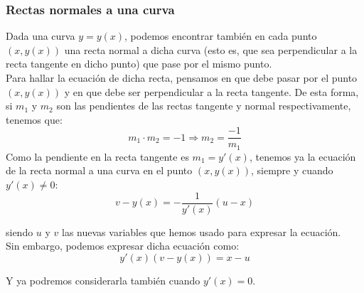 \subsubsection{Rectas normales a una curva}
Dada una curva $y=y(x)$, podemos encontrar también en cada punto $(x,y(x))$ una recta normal a dicha curva (esto es, que sea perpendicular a la recta tangente en dicho punto) que pase por el mismo punto.\\

Para hallar la ecuación de dicha recta, pensamos en que debe pasar por el punto $(x,y(x))$ y en que debe ser perpendicular a la recta tangente. De esta forma, si $m_1$ y $m_2$ son las pendientes de las rectas tangente y normal respectivamente, tenemos que:
\begin{equation*}
    m_1 \cdot m_2 = -1 \Longrightarrow m_2 = \dfrac{-1}{m_1}
\end{equation*}
Como la pendiente en la recta tangente es $m_1 = y'(x)$, tenemos ya la ecuación de la recta normal a una curva en el punto $(x,y(x))$, siempre y cuando $y'(x) \neq 0$:
\begin{equation}\label{eq:rectas_normales}
    v-y(x) = -\dfrac{1}{y'(x)}(u-x)
\end{equation}

siendo $u$ y $v$ las nuevas variables que hemos usado para expresar la ecuación.\\

Sin embargo, podemos expresar dicha ecuación como:
\begin{equation*}
    y'(x) (v-y(x)) = x-u
\end{equation*}

Y ya podremos considerarla también cuando $y'(x) = 0$.


